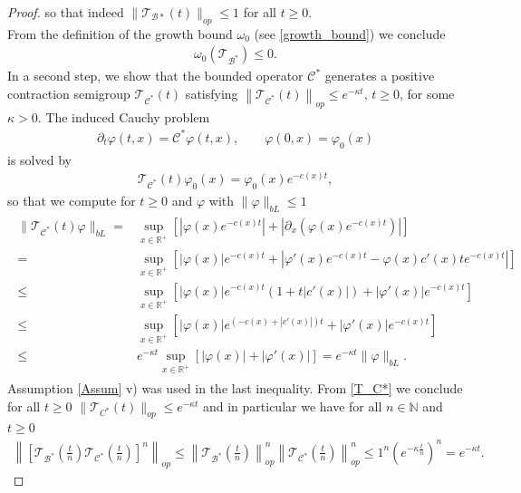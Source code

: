 \documentclass[12pt,a4paper]{amsart}
\newcommand{\norma}[1]{{\left \|#1\right \|}}
\newcommand{\R}{\mathbb{R}}
\begin{document}
\begin{proof}
so that indeed $\|\mathcal{T}_{\mathcal{B}*}(t)\|_{op}\leq 1$ for all $t\geq 0$.\\
From the definition of the growth bound $\omega_0$ (see \eqref{growth_bound}) we conclude      
    \begin{align*}
         \omega_0\left(\mathcal{T}_{\mathcal{B}^*}\right)\le 0.
    \end{align*}
In a second step, we show that the bounded operator $\mathcal{C}^*$ generates a positive contraction semigroup $\mathcal T_{\mathcal{C}^*}(t)$ satisfying $\norma{\mathcal T_{\mathcal{C}^*}(t)}_{op}\le e^{-\kappa t},\, t\ge 0$, for some $\kappa>0$. 
The induced Cauchy problem
    \begin{align*}
        \partial_t\varphi(t,x)=\mathcal{C}^*\varphi(t,x), \qquad \varphi(0,x)=\varphi_0(x)
    \end{align*}
is solved by
    \begin{align}
    \label{T_C*}
    \mathcal{T}_{\mathcal{C}^*}(t)\varphi_0(x)=
    \varphi_0(x)e^{-c(x)t},
    \end{align}
so that we compute for $t\geq 0$ and $\varphi$ with $\|\varphi\|_{bL}\leq 1$
    \begin{align}
        \begin{split}
            \label{T_C*}
\|\mathcal{T}_{\mathcal{C}^*}(t)\varphi\|_{bL}=&\sup_{x\in \R^+}\left [|\varphi(x)e^{-c(x)t}|+|\partial_x(\varphi(x)e^{-c(x)t})|\right]\\
=&\sup_{x\in \R^+}\left[|\varphi(x)|e^{-c(x)t}+|\varphi'(x)e^{-c(x)t}-\varphi(x)c'(x)te^{-c(x)t}|\right]\\
\leq &\sup_{x\in \R^+}\left[|\varphi(x)|e^{-c(x)t}(1+t|c'(x)|)+|\varphi'(x)|e^{-c(x)t}\right]\\
\leq& \sup_{x\in \R^+}\left[|\varphi(x)|e^{(-c(x)+|c'(x)|)t}+|\varphi'(x)|e^{-c(x)t}\right]\\
\leq& e^{-\kappa t}\sup_{x\in \R^+}\left[|\varphi(x)|+|\varphi'(x)|\right]=e^{-\kappa t}\|\varphi\|_{bL}.
        \end{split}
\end{align}
Assumption \ref{Assum} v) was used in the last inequality. From \eqref{T_C*} we conclude for all $t\geq 0$ $\|\mathcal{T}_{C^*}(t)\|_{op}\leq e^{-\kappa t}$ and in particular we have for all $n\in \mathbb{N}$ and $t\geq 0$
    \begin{align*}
        \left\|\left[\mathcal{T}_{\mathcal{B}^*}\left(\frac t n\right)\mathcal{T}_{\mathcal{C}^*}\left(\frac t n\right)\right]^n\right\|_{op}
        \leq\left\|\mathcal{T}_{\mathcal{B}^*}\left(\frac t n\right)\right\|^n_{op}\left\|\mathcal{T}_{\mathcal{C}^*}\left(\frac t n\right)\right\|^n_{op}\leq 1^n \left(e^{-\kappa \frac t n}\right)^n=e^{-\kappa t}.

\end{align*}
\end{proof}
\end{document}
